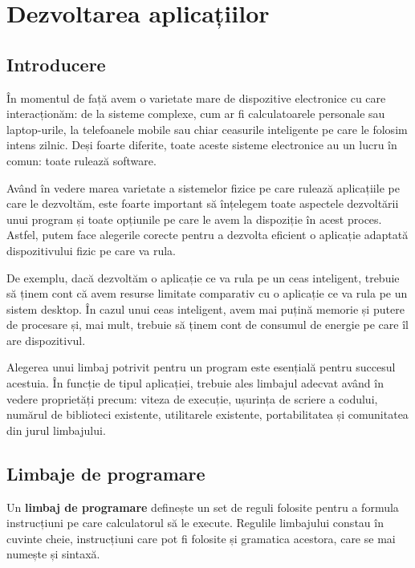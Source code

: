 
\chapter{Dezvoltarea aplicațiilor}
\label{ch:appdev}

\section{Introducere}
\label{sec:appdev:intro}

În momentul de față avem o varietate mare de dispozitive electronice cu care interacționăm: de la sisteme complexe, cum ar fi calculatoarele personale sau laptop-urile, la telefoanele mobile sau chiar ceasurile inteligente pe care le folosim intens zilnic.
Deși foarte diferite, toate aceste sisteme electronice au un lucru în comun: toate rulează software.

Având în vedere marea varietate a sistemelor fizice pe care rulează aplicațiile pe care le dezvoltăm, este foarte important să înțelegem toate aspectele dezvoltării unui program și toate opțiunile pe care le avem la dispoziție în acest proces.
Astfel, putem face alegerile corecte pentru a dezvolta eficient o aplicație adaptată dispozitivului fizic pe care va rula.

De exemplu, dacă dezvoltăm o aplicație ce va rula pe un ceas inteligent, trebuie să ținem cont că avem resurse limitate comparativ cu o aplicație ce va rula pe un sistem desktop.
În cazul unui ceas inteligent, avem mai puțină memorie și putere de procesare și, mai mult, trebuie să ținem cont de consumul de energie pe care îl are dispozitivul.

Alegerea unui limbaj potrivit pentru un program este esențială pentru succesul acestuia.
În funcție de tipul aplicației, trebuie ales limbajul adecvat având în vedere proprietăți precum: viteza de execuție, ușurința de scriere a codului, numărul de biblioteci existente, utilitarele existente, portabilitatea și comunitatea din jurul limbajului.

\section{Limbaje de programare}
\label{sec:appdev:lang}

Un \textbf{limbaj de programare} definește un set de reguli folosite pentru a formula instrucțiuni pe care calculatorul să le execute.
Regulile limbajului constau în cuvinte cheie, instrucțiuni care pot fi folosite și gramatica acestora, care se mai numește și sintaxă.

